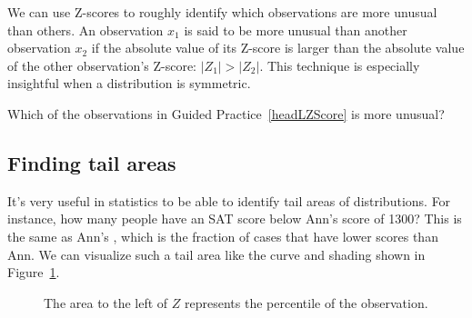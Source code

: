 We can use Z-scores to roughly identify which observations
are more unusual than others.
An observation $x_1$ is said to be more unusual than another
observation $x_2$ if the absolute value of its Z-score is larger
than the absolute value of the other observation's Z-score:
$|Z_1| > |Z_2|$.
This technique is especially insightful when a distribution
is symmetric.

\begin{exercisewrap}
\begin{nexercise}
Which of the observations in Guided Practice~\ref{headLZScore}
is more unusual?\footnotemark{}
\end{nexercise}
\end{exercisewrap}


\subsection{Finding tail areas}

It's very useful in statistics to be able to identify tail areas
of distributions.
For instance, how many people have an SAT score below
Ann's score of 1300?
This is the same as Ann's , which is
the fraction of cases that have lower scores than Ann.
We can visualize such a tail area like the curve and shading
shown in Figure~\ref{satBelow1300}.


\begin{figure}[h]
  \centering
  \caption{The area to the left of $Z$ represents the
      percentile of the observation.}
  \label{satBelow1300}
\end{figure}


